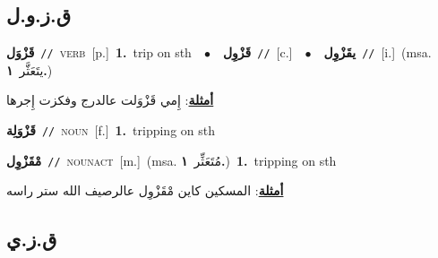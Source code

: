 \documentclass[10pt,a4paper,twoside]{article} %
\begin{document}
\begin{multicols}{2}
\vspace{-3mm}
\subsection*{\color{blue}\foreignlanguage{arabic}{ق.ز.و.ل}\color{blue}{}} 

{\setlength\topsep{0pt}\textbf{\foreignlanguage{arabic}{قَزْوَل}}\ {\color{gray}\texttt{//}\color{black}}\ \textsc{verb}\ [p.]\ \textbf{1.}~trip on sth\ \ $\bullet$\ \ \setlength\topsep{0pt}\textbf{\foreignlanguage{arabic}{قَزْوِل}}\ {\color{gray}\texttt{//}\color{black}}\ [c.]\ \ $\bullet$\ \ \setlength\topsep{0pt}\textbf{\foreignlanguage{arabic}{يقَزْوِل}}\ {\color{gray}\texttt{//}\color{black}}\ [i.]\ \color{gray}(msa. \foreignlanguage{arabic}{يتَعَثَّر}~\foreignlanguage{arabic}{\textbf{١.}})\color{black}\  \begin{flushright}\color{gray}\foreignlanguage{arabic}{\textbf{\underline{\foreignlanguage{arabic}{أمثلة}}}: إِمي قَزْوَلت عالدرج وفكزت إِجرها}\end{flushright}\color{black}} \vspace{2mm}

{\setlength\topsep{0pt}\textbf{\foreignlanguage{arabic}{قَزْوَلِة}}\ {\color{gray}\texttt{//}\color{black}}\ \textsc{noun}\ [f.]\ \textbf{1.}~tripping on sth\ } \vspace{2mm}

{\setlength\topsep{0pt}\textbf{\foreignlanguage{arabic}{مْقَزْوِل}}\ {\color{gray}\texttt{//}\color{black}}\ \textsc{noun\textunderscore act}\ [m.]\ \color{gray}(msa. \foreignlanguage{arabic}{مُتَعَثِّر}~\foreignlanguage{arabic}{\textbf{١.}})\color{black}\ \textbf{1.}~tripping on sth\  \begin{flushright}\color{gray}\foreignlanguage{arabic}{\textbf{\underline{\foreignlanguage{arabic}{أمثلة}}}: المسكين كاين مْقَزْوِل عالرصيف الله ستر راسه}\end{flushright}\color{black}} \vspace{2mm}

\vspace{-3mm}
\subsection*{\color{blue}\foreignlanguage{arabic}{ق.ز.ي}\color{blue}{}} 


\end{multicols}
\end{document}
